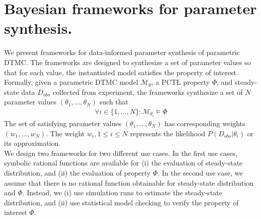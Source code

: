\chapter{Bayesian frameworks for parameter synthesis.}
We present frameworks for data-informed parameter synthesis of parametric DTMC. The frameworks are
designed to synthesize a set of parameter values so that for each value, the instantiated model
satisfies the property of interest. Formally, given a parametric DTMC model $\mathcal{M}_\theta$, a
PCTL property $\Phi$, and steady-state data $D_{obs}$ collected from experiment, the frameworks
synthesize a set of $N$ parameter values $(\theta_1,\ldots,\theta_N)$ such that
\begin{align*}
    \forall i \in \{1,\ldots,N\}: \mathcal{M}_{\theta_i} \models \Phi
\end{align*}
The set of satisfying parameter values $(\theta_1,\ldots,\theta_N)$ has corresponding weights
$(w_1,\ldots,w_N)$. The weight $w_i, 1\leq i\leq N$ represents the likelihood
$P(D_{obs}|\theta_i)$ or its approximation.\\
We design two frameworks for two different use cases. In the first use cases, symbolic rational
functions are available for (i) the evaluation of steady-state distribution, and (ii) the evaluation
of property $\Phi$. In the second use case, we assume that there is no rational function obtainable
for steady-state distribution and $\Phi$. Instead, we (i) use simulation runs to estimate the
steady-state distribution, and (ii) use statistical model checking to verify the property of
interest $\Phi$.

\newpage
